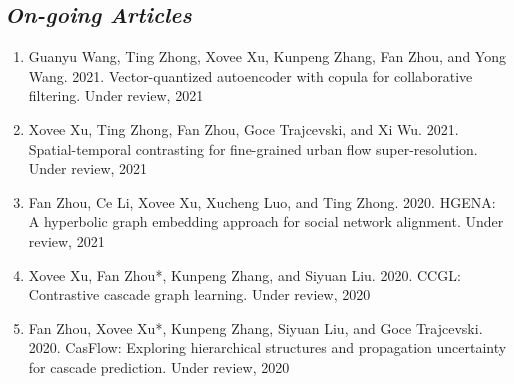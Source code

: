 \subsection*{\textnormal{\textit{On-going Articles}}}

\begin{enumerate}[resume]
    \item Guanyu Wang, Ting Zhong, Xovee Xu, Kunpeng Zhang, Fan Zhou, and Yong Wang. 2021. Vector-quantized autoencoder with copula for collaborative filtering. Under review, 2021 
    \item Xovee Xu, Ting Zhong, Fan Zhou, Goce Trajcevski, and Xi Wu. 2021. Spatial-temporal contrasting for fine-grained urban flow super-resolution. Under review, 2021
    \item Fan Zhou, Ce Li, Xovee Xu, Xucheng Luo, and Ting Zhong. 2020. HGENA: A hyperbolic graph embedding approach for social network alignment. Under review, 2021
    \item Xovee Xu, Fan Zhou*, Kunpeng Zhang, and Siyuan Liu. 2020. CCGL: Contrastive cascade graph learning. Under review, 2020
    \item Fan Zhou, Xovee Xu*, Kunpeng Zhang, Siyuan Liu, and Goce Trajcevski. 2020. CasFlow: Exploring hierarchical structures and propagation uncertainty for cascade prediction. Under review, 2020
\end{enumerate}